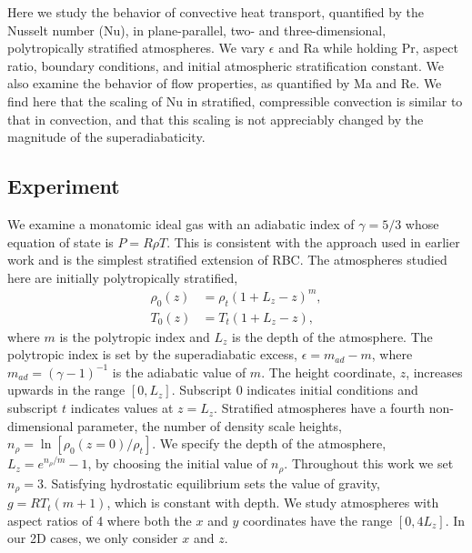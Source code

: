 Here we study the behavior of convective heat transport, quantified by the Nusselt number (Nu), in plane-parallel, two- and three-dimensional, polytropically stratified atmospheres.  
We vary $\epsilon$ and Ra while holding Pr, aspect ratio, boundary conditions, and initial atmospheric stratification constant.  
We also examine the behavior of flow properties, as quantified by Ma and Re.
We find here that the scaling of Nu in stratified, compressible convection is similar to that in \RB convection, and that this scaling is not appreciably changed by the magnitude of the superadiabaticity.

\subsection{Experiment} 
\label{sec:experiment}
We examine a monatomic ideal gas with an adiabatic index of $\gamma = 5/3$ whose equation of state is $P = R\rho T$. 
This is consistent with the approach used in earlier work \citep{graham1975, chan&all1982, brandenburg&all2005, hurlburt&all1984, cattaneo&all1990, cattaneo&all1991, brummell&all1996}  and is the simplest stratified extension of RBC.
The atmospheres studied here are initially polytropically stratified,
\begin{equation}
\begin{split}
\rho_0(z) &= \rho_{t}(1 + L_z - z)^m, \\
T_0(z)    &= T_{t}(1 + L_z - z),
\label{eqn:polytrope}
\end{split}
\end{equation}
where $m$ is the polytropic index and $L_z$ is the depth of the atmosphere.
The polytropic index is set by the superadiabatic excess, $\epsilon = m_{ad} - m$, where $m_{ad} = (\gamma - 1)^{-1}$ is the adiabatic value of $m$.
The height coordinate, $z$, increases upwards in the range $[0, L_z]$.
Subscript 0 indicates initial conditions and subscript $t$ indicates values at $z = L_z$.   
Stratified atmospheres have a fourth non-dimensional parameter, the number of density scale heights, $n_{\rho} = \ln\left[\rho_0(z=0)/\rho_t\right]$.  
We specify the depth of the atmosphere, $L_z = e^{n_{\rho}/m} - 1$, by choosing the initial value of $n_{\rho}$.
Throughout this work we set $n_{\rho} = 3$.    Satisfying hydrostatic equilibrium sets the value of gravity, $g = RT_t (m + 1)$, which is constant with depth.  
We study atmospheres with aspect ratios of 4 where both the $x$ and $y$ coordinates have the range $[0, 4L_z]$.
In our 2D cases, we only consider $x$ and $z$.

